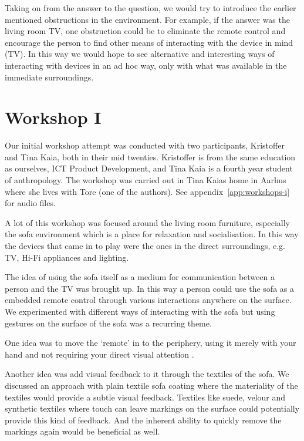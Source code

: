 Taking on from the answer to the question, we would try to introduce the earlier mentioned obstructions in the environment.
For example, if the answer was the living room TV, one obstruction could be to eliminate the remote control and encourage the person to find other means of interacting with the device in mind (TV).
In this way we would hope to see alternative and interesting ways of interacting with devices in an ad hoc way, only with what was available in the immediate surroundings.


\section{Workshop I}
\label{ch:workshops:workshop-i}
Our initial workshop attempt was conducted with two participants, Kristoffer and Tina Kaia, both in their mid twenties.
Kristoffer is from the same education as ourselves, ICT Product Development, and Tina Kaia is a fourth year student of anthropology.
The workshop was carried out in Tina Kaias home in Aarhus where she lives with Tore (one of the authors).
See appendix~\ref{app:workshops-i} for  audio files.

A lot of this workshop was focused around the living room furniture, especially the sofa environment which is a place for relaxation and socialisation.
In this way the devices that came in to play were the ones in the direct surroundings, e.g. TV, Hi-Fi appliances and lighting. 

The idea of using the sofa itself as a medium for communication between a person and the TV was brought up.
In this way a person could use the sofa as a embedded remote control through various interactions anywhere on the surface.
We experimented with different ways of interacting with the sofa but using gestures on the surface of the sofa was a recurring theme.

One idea was to move the `remote' in to the periphery, using it merely with your hand and not requiring your direct visual attention .

Another idea was add visual feedback to it through the textiles of the sofa.
We discussed an approach with plain textile sofa coating where the materiality of the textiles would provide a subtle visual feedback.
Textiles like suede, velour and synthetic textiles where touch can leave markings on the surface could potentially provide this kind of feedback.
And the inherent ability to quickly remove the markings again would be beneficial as well.

